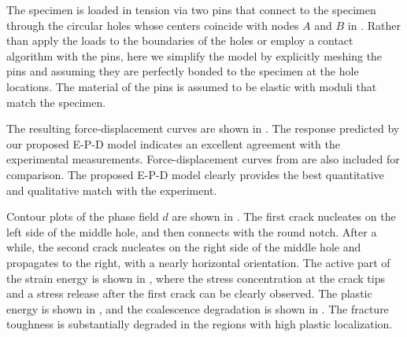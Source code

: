 The specimen is loaded in tension via two pins that connect to the specimen through the circular holes whose centers coincide with nodes $A$ and $B$ in .  Rather than apply the loads to the boundaries of the holes or employ a contact algorithm with the pins, here we simplify the model by explicitly meshing the pins and assuming they are perfectly bonded to the specimen at the hole locations.  The material of the pins is    assumed to be elastic with moduli that match the specimen.



The resulting force-displacement curves are shown in . The response predicted by our proposed E-P-D model indicates an excellent agreement with the experimental measurements. Force-displacement curves from \cite{ambati2016phase} are also included for comparison.  The proposed E-P-D model clearly provides the best quantitative and qualitative match with the experiment.

Contour plots of the phase field $d$ are shown in . The first crack nucleates on the left side of the middle hole, and then connects with the round notch. After a while, the second crack nucleates on the right side of the middle hole and propagates to the right, with a nearly horizontal orientation.
The active part of the strain energy is shown in , where the stress concentration at the crack tips and a stress release after the first crack can be clearly observed.
The plastic energy is shown in , and the coalescence degradation is shown in . The fracture toughness is substantially degraded in the regions with high plastic localization.




